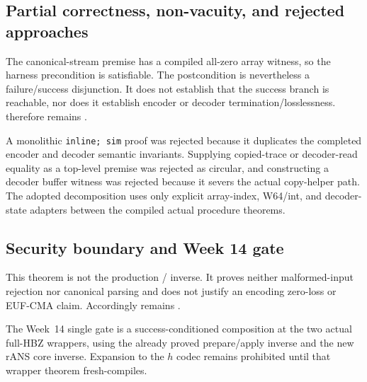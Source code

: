 \subsection*{Partial correctness, non-vacuity, and rejected approaches}

The canonical-stream premise has a compiled all-zero array witness, so the
harness precondition is satisfiable.  The postcondition is nevertheless a
failure/success disjunction.  It does not establish that the success branch is
reachable, nor does it establish encoder or decoder termination/losslessness.
 therefore remains
.

A monolithic \texttt{inline; sim} proof was rejected because it duplicates
the completed encoder and decoder semantic invariants.  Supplying copied-trace
or decoder-read equality as a top-level premise was rejected as circular, and
constructing a decoder buffer witness was rejected because it severs the
actual copy-helper path.  The adopted decomposition uses only explicit
array-index, W64/int, and decoder-state adapters between the compiled actual
procedure theorems.

\subsection*{Security boundary and Week 14 gate}

This theorem is not the production
/ inverse.  It proves
neither malformed-input rejection nor canonical parsing and does not justify
an encoding zero-loss or EUF-CMA claim.  Accordingly
 remains .

The Week~14 single gate is a success-conditioned composition at the two actual
full-HBZ wrappers, using the already proved prepare/apply inverse and the new
rANS core inverse.  Expansion to the \(h\) codec remains prohibited until that
wrapper theorem fresh-compiles.
